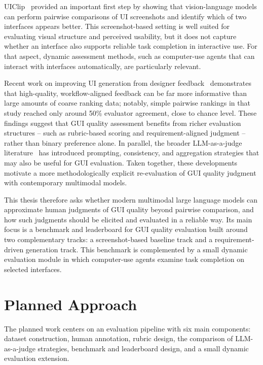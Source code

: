 \documentclass[pdflatex,sn-mathphys-num]{sn-jnl}
\begin{document}
UIClip~\cite{uiclip} provided an important first step by showing that vision-language
models can perform pairwise comparisons of UI screenshots and identify which of two
interfaces appears better. This screenshot-based setting is well suited for evaluating
visual structure and perceived usability, but it does not capture whether an interface
also supports reliable task completion in interactive use. For that aspect, dynamic
assessment methods, such as computer-use agents that can interact with interfaces
automatically, are particularly relevant.

Recent work on improving UI generation from designer feedback~\cite{designer_feedback}
demonstrates that high-quality, workflow-aligned feedback can be far more informative
than large amounts of coarse ranking data; notably, simple pairwise rankings in that
study reached only around 50\% evaluator agreement, close to chance level. These
findings suggest that GUI quality assessment benefits from richer evaluation
structures -- such as rubric-based scoring and requirement-aligned judgment -- rather
than binary preference alone. In parallel, the broader LLM-as-a-judge
literature~\cite{llm_judge} has introduced prompting, consistency, and aggregation
strategies that may also be useful for GUI evaluation. Taken together, these
developments motivate a more methodologically explicit re-evaluation of GUI quality
judgment with contemporary multimodal models.

This thesis therefore asks whether modern multimodal large language models can
approximate human judgments of GUI quality beyond pairwise comparison, and how such
judgments should be elicited and evaluated in a reliable way. Its main focus is a
benchmark and leaderboard for GUI quality evaluation built around two complementary
tracks: a screenshot-based baseline track and a requirement-driven generation track.
This benchmark is complemented by a small dynamic evaluation module in which
computer-use agents examine task completion on selected interfaces.

\section{Planned Approach}\label{sec:approach}

The planned work centers on an evaluation pipeline with six main components: dataset
construction, human annotation, rubric design, the comparison of LLM-as-a-judge
strategies, benchmark and leaderboard design, and a small dynamic evaluation
extension.
\end{document}
